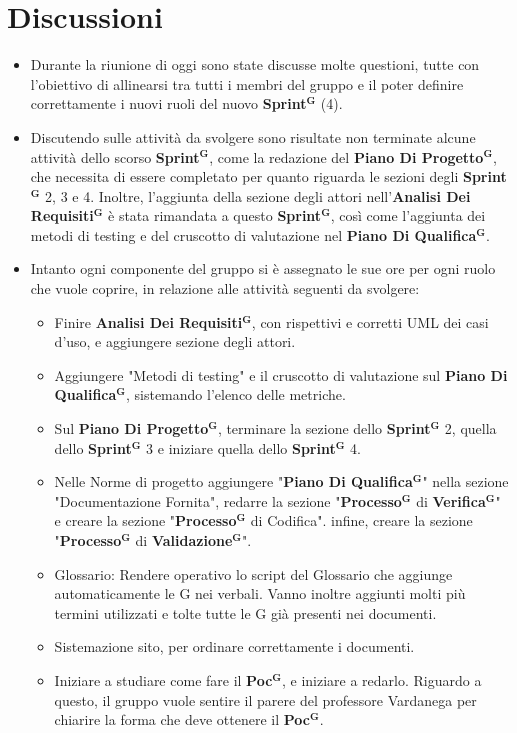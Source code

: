 \documentclass[a4paper,12pt]{article}
\newcommand{\term}[1]{\textbf{#1}$^\mathbf{G}$}
\begin{document}
\section{Discussioni}
\begin{itemize}
    \item Durante la riunione di oggi sono state discusse molte questioni, tutte con l'obiettivo di allinearsi tra tutti i membri del gruppo e il poter definire correttamente i nuovi ruoli del nuovo \term{Sprint} (4).
    \item Discutendo sulle attività da svolgere sono risultate non terminate alcune attività dello scorso \term{Sprint}, come la redazione del \term{Piano Di Progetto}, che necessita di essere completato per quanto riguarda le sezioni degli \term{Sprint} 2, 3 e 4. Inoltre, l'aggiunta della sezione degli attori nell'\term{Analisi Dei Requisiti} è stata rimandata a questo \term{Sprint}, così come l'aggiunta dei metodi di testing e del cruscotto di valutazione nel \term{Piano Di Qualifica}.
    \item Intanto ogni componente del gruppo si è assegnato le sue ore per ogni ruolo che vuole coprire, in relazione alle attività seguenti da svolgere:
    \begin{itemize}
        \item Finire \term{Analisi Dei Requisiti}, con rispettivi e corretti UML dei casi d'uso, e aggiungere sezione degli attori.
        \item Aggiungere "Metodi di testing" e il cruscotto di valutazione sul \term{Piano Di Qualifica}, sistemando l'elenco delle metriche.
        \item Sul \term{Piano Di Progetto}, terminare la sezione dello \term{Sprint} 2, quella dello \term{Sprint} 3 e iniziare quella dello \term{Sprint} 4.
        \item Nelle Norme di progetto aggiungere "\term{Piano Di Qualifica}" nella sezione "Documentazione Fornita", redarre la sezione "\term{Processo} di \term{Verifica}" e creare la sezione "\term{Processo} di Codifica". infine, creare la sezione "\term{Processo} di \term{Validazione}".
        \item Glossario: Rendere operativo lo script del Glossario che aggiunge automaticamente le G nei verbali. Vanno inoltre aggiunti molti più termini utilizzati e tolte tutte le G già presenti nei documenti.
        \item Sistemazione sito, per ordinare correttamente i documenti.
        \item Iniziare a studiare come fare il \term{Poc}, e iniziare a redarlo. Riguardo a questo, il gruppo vuole sentire il parere del professore Vardanega per chiarire la forma che deve ottenere il \term{Poc}.
    \end{itemize}
\end{itemize}
\end{document}
